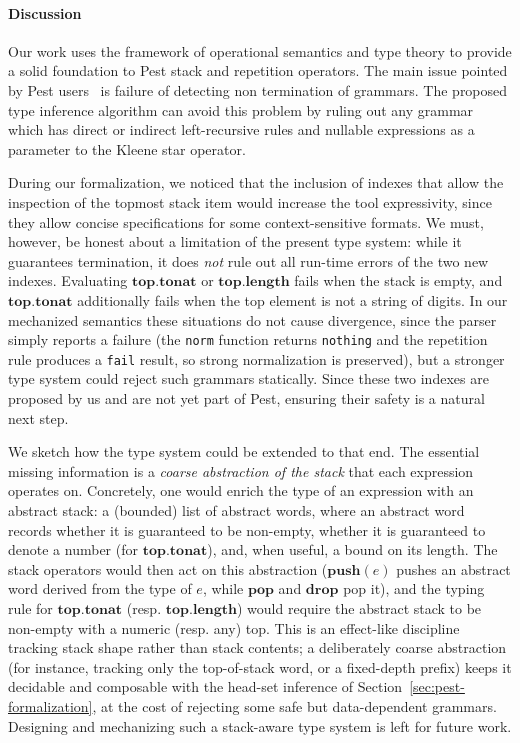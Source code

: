 \documentclass[preprint,12pt]{elsarticle}
\theoremstyle{definition}
\begin{document}
\paragraph{Discussion}
Our work uses the framework of operational semantics and type
theory to provide a solid foundation to Pest stack and repetition
operators. The main issue pointed by Pest users~\cite{PESTBUG} is failure of
detecting non termination of grammars. The proposed type inference
algorithm can avoid this problem by ruling out any grammar which
has direct or indirect left-recursive rules and nullable expressions
as a parameter to the Kleene star operator.

During our formalization, we noticed that the inclusion
of indexes that allow the inspection of the topmost stack item
would increase the tool expressivity, since they allow concise
specifications for some context-sensitive formats. We must, however, be honest
about a limitation of the present type system: while it guarantees termination,
it does \emph{not} rule out all run-time errors of the two new indexes. Evaluating
$\mathbf{top.tonat}$ or $\mathbf{top.length}$ fails when the stack is empty, and
$\mathbf{top.tonat}$ additionally fails when the top element is not a string of
digits. In our mechanized semantics these situations do not cause divergence, since the parser simply reports a failure (the \lstinline{norm} function returns
\lstinline{nothing} and the repetition rule produces a \lstinline{fail} result,
so strong normalization is preserved), but a stronger type system could reject
such grammars statically. Since these two indexes are proposed by us and are not
yet part of Pest, ensuring their safety is a natural next step.

We sketch how the type system could be extended to that end. The essential
missing information is a \emph{coarse abstraction of the stack} that each
expression operates on. Concretely, one would enrich the type of an expression
with an abstract stack: a (bounded) list of abstract words, where an abstract
word records whether it is guaranteed to be non-empty, whether it is guaranteed to
denote a number (for $\mathbf{top.tonat}$), and, when useful, a bound on its
length. The stack operators would then act on this abstraction ($\mathbf{push}(e)$
pushes an abstract word derived from the type of $e$, while $\mathbf{pop}$ and
$\mathbf{drop}$ pop it), and the typing rule for $\mathbf{top.tonat}$ (resp.
$\mathbf{top.length}$) would require the abstract stack to be non-empty with a
numeric (resp. any) top. This is an effect-like discipline tracking stack shape
rather than stack contents; a deliberately coarse abstraction (for instance,
tracking only the top-of-stack word, or a fixed-depth prefix) keeps it decidable
and composable with the head-set inference of Section~\ref{sec:pest-formalization},
at the cost of rejecting some safe but data-dependent grammars. Designing and
mechanizing such a stack-aware type system is left for future work.
\end{document}
